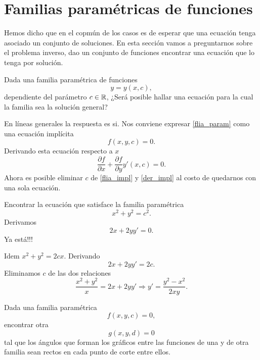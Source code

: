 \section{Familias paramétricas de funciones}

Hemos dicho que en el copmún de los casos es de esperar que una
ecuación tenga asociado un conjunto de soluciones. En esta sección vamos a preguntarnos sobre el problema inverso, dao un conjunto de funciones encontrar una ecuación que lo tenga por solución.



\begin{problema}
Dada una familia paramétrica de funciones
 \begin{equation}\label{flia_param}y=y(x,c),\end{equation}
 dependiente del parámetro $c\in\rr$, ¿Será posible hallar una ecuación para la cual la familia sea la solución general?
\end{problema}

En líneas generales la respuesta es si. Nos conviene expresar \eqref{flia_param} como una ecuación implícita
\begin{equation}\label{flia_impl}f(x,y,c)=0.\end{equation}
Derivando esta ecuación respecto a $x$
\begin{equation}\label{der_impl}
 \frac{\partial f}{\partial x}+\frac{\partial f}{\partial y}y'(x,c)=0.
\end{equation}
Ahora es posible eliminar $c$ de \eqref{flia_impl} y \eqref{der_impl} al costo de quedarnos con una sola ecuación.




\begin{ejemplo} Encontrar la ecuación que satisface la familia paramétrica
\[x^2+y^2=c^2.\]
Derivamos
\[2x+2yy'=0.\]
Ya está!!!
\end{ejemplo}

\begin{ejemplo} Idem $x^2+y^2=2cx$.  Derivando
\[2x+2yy'=2c.\]
Eliminamos $c$ de las dos relaciones
\[\frac{x^2+y^2}{x}=2x+2yy'\Rightarrow \boxed{y'=\frac{y^2-x^2}{2xy}}.\]
\end{ejemplo}


\begin{problema}
 Dada una familia paramétrica
 \[f(x,y,c)=0,\]
 encontrar otra
 \[g(x,y,d)=0\]
 tal que los ángulos que forman los gráficos entre las funciones de una y de otra familia sean rectos  en cada punto de corte entre ellos.
\end{problema}




